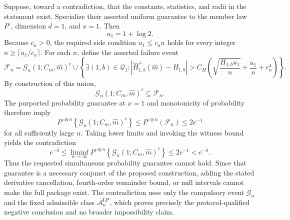 Suppose, toward a contradiction, that the constants, statistics, and radii in the statement exist. Specialize their asserted uniform guarantee to the member law \(P^\circ\), dimension \(d=1\), and \(x=1\). Then
\[
u_1=1+\log 2.
\]
Because \(c_u>0\), the required side condition \(u_1\le c_u n\) holds for every integer \(n\ge \lceil u_1/c_u\rceil\). For such \(n\), define the asserted failure event
\[
\mathcal F_n=
\mathcal G_n(1;C_m,\widehat m)^c
\cup
\left\{\exists(1,b)\in\mathcal Q_1:
\left|\widehat H^\perp_{1,b}(\widehat m)-H_{1,b}\right|
>C_H\left(\sqrt{\frac{H_{1,b}u_1}{n}}+\frac{u_1}{n}+r_n^4\right)
\right\}.
\]
By construction of this union,
\[
\mathcal G_n(1;C_m,\widehat m)^c\subseteq\mathcal F_n.
\]
The purported probability guarantee at \(x=1\) and monotonicity of probability therefore imply
\[
P^{\circ\otimes n}\!\left\{\mathcal G_n(1;C_m,\widehat m)^c\right\}
\le P^{\circ\otimes n}(\mathcal F_n)
\le 2e^{-1}
\]
for all sufficiently large \(n\). Taking lower limits and invoking the witness bound yields the contradiction
\[
e^{-\delta}
\le
\liminf_{n\to\infty}P^{\circ\otimes n}\!\left\{\mathcal G_n(1;C_m,\widehat m)^c\right\}
\le 2e^{-1}
<e^{-\delta}.
\]
Thus the requested simultaneous probability guarantee cannot hold. Since that guarantee is a necessary conjunct of the proposed construction, adding the stated derivative cancellation, fourth-order remainder bound, or null intervals cannot make the full package exist. The contradiction uses only the compulsory event \(\mathcal G_n\) and the fixed admissible class \(\mathcal A_n^{\mathrm{LP}}\), which proves precisely the protocol-qualified negative conclusion and no broader impossibility claim.
